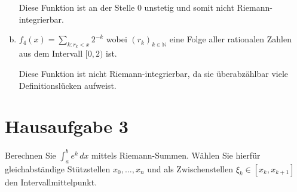 \documentclass{article}
\begin{document}
\begin{enumerate}[a)]

  Diese Funktion ist an der Stelle $0$ unstetig und somit nicht Riemann-integrierbar.

\item $f_4(x) = \underset{k \colon r_k < x}{\sum} 2^{-k}$  wobei
  $(r_k)_{k \in \mathbb{N}}$ eine Folge aller rationalen Zahlen aus dem
  Intervall $[0, 2)$ ist.

  Diese Funktion ist nicht Riemann-integrierbar, da sie überabzählbar viele
  Definitionslücken aufweist.
  
\end{enumerate}

\newpage
\section*{Hausaufgabe 3}

Berechnen Sie $\int_a^b e^k \,dx$  mittels Riemann-Summen. Wählen Sie hierfür
gleichabständige Stützstellen $x_0, \ldots, x_n$ und als Zwischenstellen
$\xi_k \in [x_k, x_{k + 1}]$ den Intervallmittelpunkt.
\end{document}
